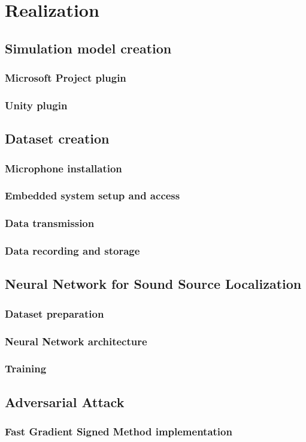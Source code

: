 \chapter{Realization}
\label{ch:setup}

\section{Simulation model creation}

\subsection{Microsoft Project plugin}

\subsection{Unity plugin}

\section{Dataset creation}

\subsection{Microphone installation}

\subsection{Embedded system setup and access}

\subsection{Data transmission}

\subsection{Data recording and storage}

\section{Neural Network for Sound Source Localization}

\subsection{Dataset preparation}

\subsection{Neural Network architecture}

\subsection{Training}

\section{Adversarial Attack}

\subsection{Fast Gradient Signed Method implementation}


